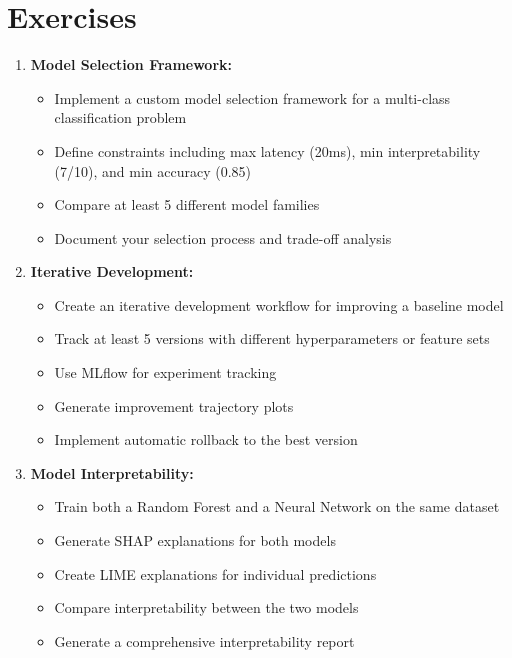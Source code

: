 \section{Exercises}

\begin{enumerate}
    \item \textbf{Model Selection Framework:}
    \begin{itemize}
        \item Implement a custom model selection framework for a multi-class classification problem
        \item Define constraints including max latency (20ms), min interpretability (7/10), and min accuracy (0.85)
        \item Compare at least 5 different model families
        \item Document your selection process and trade-off analysis
    \end{itemize}

    \item \textbf{Iterative Development:}
    \begin{itemize}
        \item Create an iterative development workflow for improving a baseline model
        \item Track at least 5 versions with different hyperparameters or feature sets
        \item Use MLflow for experiment tracking
        \item Generate improvement trajectory plots
        \item Implement automatic rollback to the best version
    \end{itemize}

    \item \textbf{Model Interpretability:}
    \begin{itemize}
        \item Train both a Random Forest and a Neural Network on the same dataset
        \item Generate SHAP explanations for both models
        \item Create LIME explanations for individual predictions
        \item Compare interpretability between the two models
        \item Generate a comprehensive interpretability report
    \end{itemize}


\end{enumerate}

